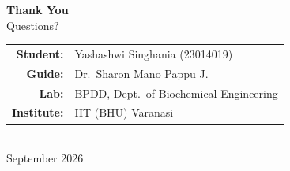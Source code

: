 \documentclass[aspectratio=169, 11pt]{beamer}
\begin{document}
\begin{frame}[plain]
  \vfill
  \begin{center}
    {\LARGE\bfseries\color{darkcharcoal} Thank You}\\[0.3cm]
    {\large\color{accentblue} Questions?}\\[1cm]
    \begin{tabular}{rl}
      \textbf{Student:} & Yashashwi Singhania (23014019) \\
      \textbf{Guide:} & Dr.\ Sharon Mano Pappu J. \\
      \textbf{Lab:} & BPDD, Dept.\ of Biochemical Engineering \\
      \textbf{Institute:} & IIT (BHU) Varanasi \\
    \end{tabular}\\[0.4cm]
    {\small\color{darkcharcoal!60} September 2026}
  \end{center}
  \vfill
\end{frame}
\end{document}
